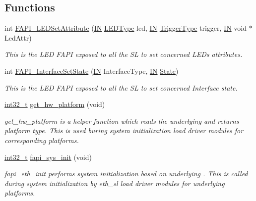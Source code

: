\subsection*{Functions}
\begin{DoxyCompactItemize}
\item 
int \hyperlink{group__FAPI__SYSTEM_ga9d4d643a4ca87eb7be2f88afb184951d}{F\-A\-P\-I\-\_\-\-L\-E\-D\-Set\-Attribute} (\hyperlink{group__LIBHELP_gac2bbd6d630a06a980d9a92ddb9a49928}{I\-N} \hyperlink{group__FAPI__SYSTEM_ga5f99aa5077acffebe451d1268c69db58}{L\-E\-D\-Type} led, \hyperlink{group__LIBHELP_gac2bbd6d630a06a980d9a92ddb9a49928}{I\-N} \hyperlink{group__FAPI__SYSTEM_ga59b7f49353f2a99b6c22d2eaae0fe9e9}{Trigger\-Type} trigger, \hyperlink{group__LIBHELP_gac2bbd6d630a06a980d9a92ddb9a49928}{I\-N} void $\ast$Led\-Attr)
\begin{DoxyCompactList}\small\item\em This is the L\-E\-D F\-A\-P\-I exposed to all the S\-L to set concerned L\-E\-Ds attributes. \end{DoxyCompactList}\item 
int \hyperlink{group__FAPI__SYSTEM_ga139c30b744805351cce999ba70490e60}{F\-A\-P\-I\-\_\-\-Interface\-Set\-State} (\hyperlink{group__LIBHELP_gac2bbd6d630a06a980d9a92ddb9a49928}{I\-N} Interface\-Type, \hyperlink{group__LIBHELP_gac2bbd6d630a06a980d9a92ddb9a49928}{I\-N} \hyperlink{group__FAPI__SYSTEM_ga5d74787dedbc4e11c1ab15bf487e61f8}{State})
\begin{DoxyCompactList}\small\item\em This is the L\-E\-D F\-A\-P\-I exposed to all the S\-L to set concerned Interface state. \end{DoxyCompactList}\item 
\hyperlink{commondefs_8h_a32f2e37ee053cf2ce8ca28d1f74630e5}{int32\-\_\-t} \hyperlink{group__FAPI__SYSTEM_gaafe17a5ce4b9ba631641351d676240cf}{get\-\_\-hw\-\_\-platform} (void)
\begin{DoxyCompactList}\small\item\em get\-\_\-hw\-\_\-platform is a helper function which reads the underlying  and returns platform type. This is used buring system initialization  load driver modules for corresponding platforms. \end{DoxyCompactList}\item 
\hyperlink{commondefs_8h_a32f2e37ee053cf2ce8ca28d1f74630e5}{int32\-\_\-t} \hyperlink{group__FAPI__SYSTEM_ga2a127d34cb36632fd804b75c5b2cec97}{fapi\-\_\-sys\-\_\-init} (void)
\begin{DoxyCompactList}\small\item\em fapi\-\_\-eth\-\_\-init performs system initialization based on underlying . This is called during system initialization by eth\-\_\-sl  load driver modules for underlying platforms. \end{DoxyCompactList}\item 

\end{DoxyCompactItemize}
